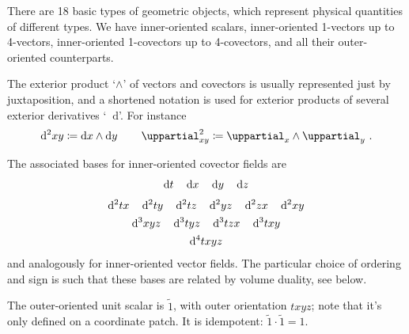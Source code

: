 \documentclass[a4paper,12pt,%
onecolumn,oneside,article,%
british%
]{memoir}
\theoremstyle{remark}
\theoremstyle{innote}
\newcommand*{\de}{\mathop{}\!\uppartial}%
\newcommand*{\di}{\mathop{}\!\mathrm{d}}%
\newcommand*{\defd}{\coloneqq}
\renewcommand*{\|}[1][]{\nonscript\:#1\vert\nonscript\:\mathopen{}}
\newcommand*{\se}[1]{\de_{#1}}
\newcommand*{\sse}[1]{\de^{2}_{#1}}
\newcommand*{\si}[1]{\di{#1}}
\newcommand*{\ssi}[1]{\di^{2}{#1}}
\newcommand*{\sssi}[1]{\di^{3}{#1}}
\newcommand*{\ssssi}[1]{\di^{4}{#1}}
\newcommand*{\tw}[1]{\tilde{#1}}
\begin{document}
There are 18 basic types of geometric objects, which represent physical quantities of different types. We have inner-oriented scalars, inner-oriented 1-vectors up to 4-vectors, inner-oriented 1-covectors up to 4-covectors, and all their outer-oriented counterparts.

The exterior product \enquote*{$\land$} of vectors and covectors is usually represented just by juxtaposition, and a shortened notation is used for exterior products of several exterior derivatives \enquote*{$\di$}. For instance
\begin{equation}
  \label{eq:notation_dwedge}
  \di^{2}xy \defd \di x \land \di y
  \qquad
  \sse{xy} \defd \se{x} \land \se{y} \ .
\end{equation}

The associated bases for inner-oriented covector fields are
\begin{subequations}\label{eq:basis}
\begin{gather}
  \label{eq:basis_1vec}
  \si{t}\quad
  \si{x}\quad
  \si{y}\quad
  \si{z}
  \\[\jot]
  \label{eq:basis_2vec}
  \ssi{tx}\quad
  \ssi{ty}\quad
  \ssi{tz}\quad
  \ssi{yz}\quad
  \ssi{zx}\quad
  \ssi{xy}
  \\
  \label{eq:basis_3vec}
  \sssi{xyz}\quad
  \sssi{tyz}\quad
  \sssi{tzx}\quad
  \sssi{txy}
  \\
  \label{eq:basis_4vec}
  \ssssi{txyz}
\end{gather}
\end{subequations}
and analogously for inner-oriented vector fields. The particular choice of ordering and sign is such that these bases are related by volume duality, see below.

The outer-oriented unit scalar is $\tw{1}$, with outer orientation $txyz$; note that it's only defined on a coordinate patch. It is idempotent: $\tw{1}\cdot\tw{1} =1$.
\end{document}
